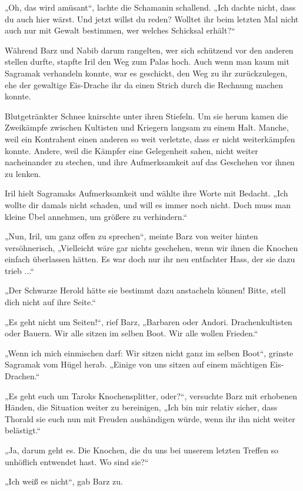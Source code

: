 „Oh, das wird amüsant“, lachte die Schamanin schallend. „Ich dachte nicht, dass du auch hier wärst. Und jetzt willst du reden? Wolltet ihr beim letzten Mal nicht auch nur mit Gewalt bestimmen, wer welches Schicksal erhält?“

Während Barz und Nabib darum rangelten, wer sich schützend vor den anderen stellen durfte, stapfte Iril den Weg zum Palas hoch. Auch wenn man kaum mit Sagramak verhandeln konnte, war es geschickt, den Weg zu ihr zurückzulegen, ehe der gewaltige Eis-Drache ihr da einen Strich durch die Rechnung machen konnte.

Blutgetränkter Schnee knirschte unter ihren Stiefeln. Um sie herum kamen die Zweikämpfe zwischen Kultisten und Kriegern langsam zu einem Halt. Manche, weil ein Kontrahent einen anderen so weit verletzte, dass er nicht weiterkämpfen konnte. Andere, weil die Kämpfer eine Gelegenheit sahen, nicht weiter nacheinander zu stechen, und ihre Aufmerksamkeit auf das Geschehen vor ihnen zu lenken.

Iril hielt Sagramaks Aufmerksamkeit und wählte ihre Worte mit Bedacht. „Ich wollte dir damals nicht schaden, und will es immer noch nicht. Doch muss man kleine Übel annehmen, um größere zu verhindern.“

„Nun, Iril, um ganz offen zu sprechen“, meinte Barz von weiter hinten versöhnerisch, „Vielleicht wäre gar nichts geschehen, wenn wir ihnen die Knochen einfach überlassen hätten. Es war doch nur ihr neu entfachter Hass, der sie dazu trieb ...“

„Der Schwarze Herold hätte sie bestimmt dazu anstacheln können! Bitte, stell dich nicht auf ihre Seite.“

„Es geht nicht um Seiten!“, rief Barz, „Barbaren oder Andori. Drachenkultisten oder Bauern. Wir alle sitzen im selben Boot. Wir alle wollen Frieden.“

„Wenn ich mich einmischen darf: Wir sitzen nicht ganz im selben Boot“, grinste Sagramak vom Hügel herab. „Einige von uns sitzen auf einem mächtigen Eis-Drachen.“

„Es geht euch um Taroks Knochensplitter, oder?“, versuchte Barz mit erhobenen Händen, die Situation weiter zu bereinigen, „Ich bin mir relativ sicher, dass Thorald sie euch nun mit Freuden aushändigen würde, wenn ihr ihn nicht weiter belästigt.“

„Ja, darum geht es. Die Knochen, die du uns bei unserem letzten Treffen so unhöflich entwendet hast. Wo sind sie?“

„Ich weiß es nicht“, gab Barz zu.

